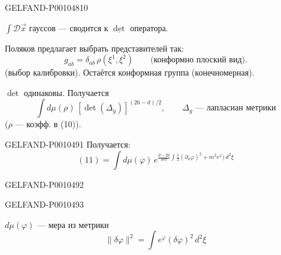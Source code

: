 \begin{GelfandAdjacentEvidence}{GELFAND-P001048}{10}


$\int\mathcal{D}\vec{x}$ гауссов — сводится к $\underline{\det}$ оператора.

Поляков предлагает выбрать представителей так:
\begin{equation*}
g_{ab}=\delta_{ab}\,\rho(\xi^1,\xi^2)
\qquad\text{(конформно плоский вид).}
\tag{10}
\end{equation*}
(выбор калибровки). Остаётся конформная группа (конечномерная).
\end{GelfandAdjacentEvidence}


$\det$ одинаковы. Получается
\begin{equation*}
\int d\mu(\rho)\,[\det(\Delta_g)]^{(26-d)/2},
\qquad\Delta_g\text{ — лапласиан метрики}
\tag{11}
\end{equation*}
($\rho$ — коэфф. в (10)).


\begin{GelfandAdjacentEvidence}{GELFAND-P001049}{1}
Получается:
\begin{equation*}
(11)=\int d\mu(\varphi)\,
e^{\frac{d-26}{48\pi}\int\frac12(\partial_a\varphi)^2+
m^{2}e^{\varphi})\,d^2\xi}
\tag{12}
\end{equation*}
\end{GelfandAdjacentEvidence}
\begin{GelfandAdjacentEvidence}{GELFAND-P001049}{2}

\end{GelfandAdjacentEvidence}
\begin{GelfandAdjacentEvidence}{GELFAND-P001049}{3}

\end{GelfandAdjacentEvidence}


$d\mu(\varphi)$ — мера из метрики
\begin{equation*}
\|\delta\varphi\|^2=\int e^{\varphi}(\delta\varphi)^2\,d^2\xi
\tag{13}
\end{equation*}


